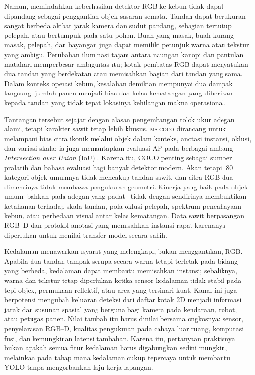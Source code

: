 Namun, memindahkan keberhasilan detektor RGB ke kebun tidak dapat dipandang
sebagai penggantian objek sasaran semata. Tandan dapat berukuran sangat
berbeda akibat jarak kamera dan sudut pandang, sebagian tertutup pelepah,
atau bertumpuk pada satu pohon. Buah yang masak, buah kurang masak, pelepah,
dan bayangan juga dapat memiliki petunjuk warna atau tekstur yang ambigu.
Perubahan iluminasi tajam antara naungan kanopi dan pantulan matahari
memperbesar ambiguitas itu; kotak pembatas RGB dapat menyatukan dua tandan
yang berdekatan atau memisahkan bagian dari tandan yang sama. Dalam konteks
operasi kebun, kesalahan demikian mempunyai dua dampak langsung: jumlah
panen menjadi bias dan kelas kematangan yang diberikan kepada tandan yang
tidak tepat lokasinya kehilangan makna operasional.

Tantangan tersebut sejajar dengan alasan pengembangan tolok ukur adegan
alami, tetapi karakter sawit tetap lebih khusus. \textsc{ms coco} dirancang
untuk melampaui bias citra ikonik melalui objek dalam konteks, anotasi
instansi, oklusi, dan variasi skala; ia juga memantapkan evaluasi AP pada
berbagai ambang \textit{Intersection over Union} (IoU) \cite{lin2014coco}.
Karena itu, COCO penting sebagai sumber pralatih dan bahasa evaluasi bagi
banyak detektor modern. Akan tetapi, 80 kategori objek umumnya tidak
mencakup tandan sawit, dan citra RGB dua dimensinya tidak membawa pengukuran
geometri. Kinerja yang baik pada objek umum--bahkan pada adegan yang padat--
tidak dengan sendirinya membuktikan ketahanan terhadap skala tandan, pola
oklusi pelepah, spektrum pencahayaan kebun, atau perbedaan visual antar
kelas kematangan. Data sawit berpasangan RGB--D dan protokol anotasi yang
memisahkan instansi rapat karenanya diperlukan untuk menilai transfer model
secara sahih.

Kedalaman menawarkan isyarat yang melengkapi, bukan menggantikan, RGB.
Apabila dua tandan tampak serupa secara warna tetapi terletak pada bidang
yang berbeda, kedalaman dapat membantu memisahkan instansi; sebaliknya,
warna dan tekstur tetap diperlukan ketika sensor kedalaman tidak stabil pada
tepi objek, permukaan reflektif, atau area yang tersinari kuat. Kanal ini
juga berpotensi mengubah keluaran deteksi dari daftar kotak 2D menjadi
informasi jarak dan susunan spasial yang berguna bagi kamera pada kendaraan,
robot, atau petugas panen. Nilai tambah itu harus dinilai bersama ongkosnya:
sensor, penyelarasan RGB--D, kualitas pengukuran pada cahaya luar ruang,
komputasi fusi, dan kemungkinan latensi tambahan. Karena itu, pertanyaan
praktisnya bukan apakah semua fitur kedalaman harus digabungkan sedini
mungkin, melainkan pada tahap mana kedalaman cukup tepercaya untuk membantu
YOLO tanpa mengorbankan laju kerja lapangan.

